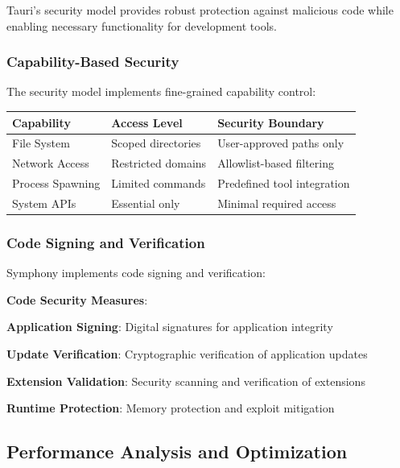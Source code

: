 Tauri's security model provides robust protection against malicious code while enabling necessary functionality for development tools.

\subsubsection*{Capability-Based Security}

The security model implements fine-grained capability control:

\begin{center}
\begin{tabular}{@{}lll@{}}
\toprule
\textbf{Capability} & \textbf{Access Level} & \textbf{Security Boundary} \\
\midrule
File System & Scoped directories & User-approved paths only \\
Network Access & Restricted domains & Allowlist-based filtering \\
Process Spawning & Limited commands & Predefined tool integration \\
System APIs & Essential only & Minimal required access \\
\bottomrule
\end{tabular}
\end{center}

\subsubsection*{Code Signing and Verification}

Symphony implements code signing and verification:

\begin{alertbox}
\textbf{Code Security Measures}:
\begin{compactlist}
    \item \textbf{Application Signing}: Digital signatures for application integrity
    \item \textbf{Update Verification}: Cryptographic verification of application updates
    \item \textbf{Extension Validation}: Security scanning and verification of extensions
    \item \textbf{Runtime Protection}: Memory protection and exploit mitigation
\end{compactlist}
\end{alertbox}

\subsection*{Performance Analysis and Optimization}

